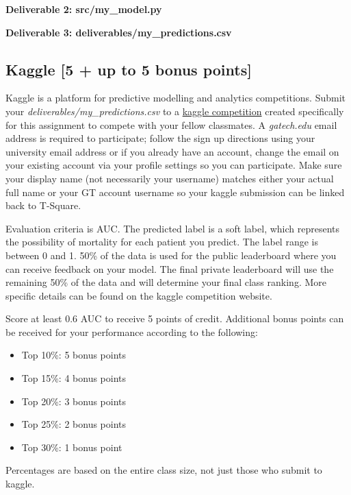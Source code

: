 \documentclass[12pt]{article}
\begin{document}
\textbf{Deliverable 2: src/my\_model.py}

\textbf{Deliverable 3: deliverables/my\_predictions.csv}


\subsection{Kaggle [5 + up to 5 bonus points]}
Kaggle is a platform for predictive modelling and analytics competitions. Submit your \textit{deliverables/my\_predictions.csv} to a \href{https://www.kaggle.com/c/2018-spring-cse6250-hw1}{kaggle competition} created specifically for this assignment to compete with your fellow classmates. A \textit{gatech.edu} email address is required to participate; follow the sign up directions using your university email address or if you already have an account, change the email on your existing account via your profile settings so you can participate. Make sure your display name (not necessarily your username) matches either your actual full name or your GT account username so your kaggle submission can be linked back to T-Square.

Evaluation criteria is AUC. The predicted label is a soft label, which represents the possibility of mortality for each patient you predict. The label range is between 0 and 1. 50\% of the data is used for the public leaderboard where you can receive feedback on your model. The final private leaderboard will use the remaining 50\% of the data and will determine your final class ranking. More specific details can be found on the kaggle competition website.

Score at least 0.6 AUC to receive 5 points of credit. Additional bonus points can be received for your performance according to the following:

\begin{itemize}
\item Top 10\%: 5 bonus points
\item Top 15\%: 4 bonus points
\item Top 20\%: 3 bonus points
\item Top 25\%: 2 bonus points
\item Top 30\%: 1 bonus point
\end{itemize}
Percentages are based on the entire class size, not just those who submit to kaggle.

\end{document}
